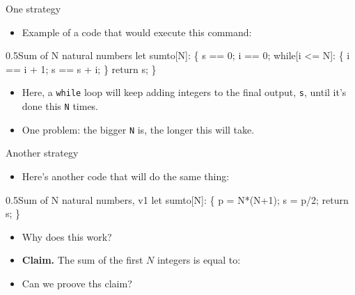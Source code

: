 \documentclass[11pt,aspectratio=1610,handout]{beamer}
\begin{document}
\begin{frame}[fragile]{One strategy}
		\begin{itemize} 
			\item Example of a code that would execute this command: 
		\end{itemize}
		\begin{code}{0.5}{Sum of N natural numbers}
		  let sumto[N]:
		     \{
		       s == 0;
		       i == 0;
		       while[i <= N]:
		       \{
		          i == i + 1;
		          s == s + i;		          
		       \}
		       return s;
		     \}\end{code}
		\vspace{-1mm}\p
		\begin{itemize}
			\item Here, a \verb|while| loop will keep adding integers to the final output, \verb|s|, until it's done this \verb|N| times. 
			\item One problem: the bigger \verb|N| is, the longer this will take. 
		\end{itemize}
\end{frame}

\begin{frame}[fragile]{Another strategy}
		\begin{itemize}
			\item Here's another code that will do the same thing: \p
		\end{itemize}
		
\begin{code}{0.5}{Sum of N natural numbers, v1}
	let sumto[N]:
	\{
		p = N*(N+1);
		s = p/2;
		return s;
	\}
\end{code}
	

    \vspace{-1mm}\p
	\begin{itemize}
		\item Why does this work?
	
	\item \textbf{Claim.} The sum of the first $N$ integers is equal to: 
	
	
\begin{center}
\end{center}
	
	\p
	\item Can we proove ths claim? 
   \end{itemize}

\end{frame}
\end{document}

